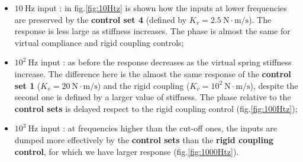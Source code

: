 \begin{itemize}
\item $ 10 \ \text{Hz} $ input : in fig.\ref{fig:10Htz} is shown how the inputs at lower frequencies are preserved by the \textbf{control set 4} (defined by $ K_v = 2.5 \ \text{N}\cdot\text{m/s} $). The response is less large as stiffness increases. The phase is almost the same for virtual compliance and rigid coupling controls;
\item $10^{2} \ \text{Hz}$ input : as before the response decreases as the virtual spring stiffness increase. The difference here is the almost the same response of the \textbf{control set 1} ($ K_v = 20 \ \text{N}\cdot\text{m/s} $) and the rigid coupling ($ K_v = 10^2 \ \text{N}\cdot\text{m/s} $), despite the second one is defined by a larger value of stiffness. The phase relative to the \textbf{control sets} is delayed respect to the rigid coupling control (fig.\ref{fig:100Htz});
\item $10^{3} \ \text{Hz}$ input : at frequencies higher than the cut-off ones, the
inputs are dumped more effectively by the \textbf{control sets} than the \textbf{rigid coupling control}, for which we have larger response (fig.\ref{fig:1000Htz}).
\end{itemize}

